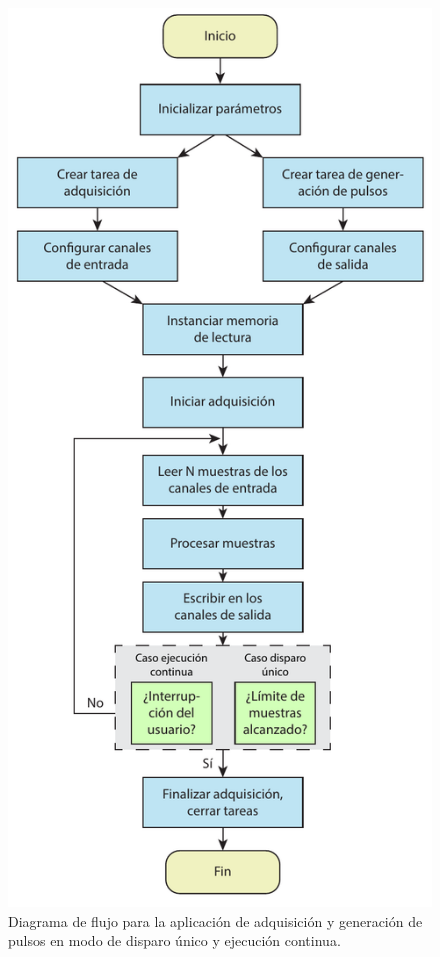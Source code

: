 \documentclass[a4paper,11pt]{article}
\begin{document}
	\begin{figure}[!h] 
        \centering
        \includegraphics[height=.95\textheight]{flujo_software.pdf}
        \caption{Diagrama de flujo para la aplicación de adquisición y generación de pulsos en modo de disparo único y ejecución continua.}
        \label{fig:flujo_software}
 
    \end{figure}
	
\end{document}
